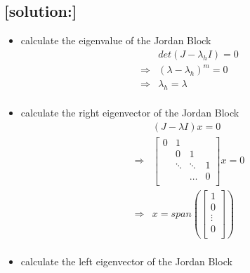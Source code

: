 \documentclass[12pt]{article}
\begin{document}
\subsection*{[solution:]}
    \begin{itemize}
        \item calculate the eigenvalue of the Jordan Block
            \[
                \begin{aligned}
                        &det(J- \lambda_h I) = 0\\
            \Rightarrow &(\lambda-\lambda_h)^m = 0\\
            \Rightarrow &\lambda_h = \lambda\\
                \end{aligned}
            \]
        \item calculate the right eigenvector of the Jordan Block
            \[
                \begin{aligned}
                        &(J- \lambda I)x = 0\\
            \Rightarrow &   \left[\begin{array}{cccc}
                                0 & 1       \\
                                  & 0 & 1        \\
                                  &\ddots& \ddots  & 1 \\
                                  &      & \hdots  & 0 \\
                            \end{array}\right]x = 0\\
            \Rightarrow &   x = span(\left[\begin{array}{c}
                                                1\\
                                                0\\
                                                \vdots\\
                                                0\\
                                            \end{array}
                                        \right])\\
                \end{aligned}
            \]
        \item calculate the left eigenvector of the Jordan Block
            \[
                \begin{aligned}

\end{aligned}\]
\end{itemize}
\end{document}
